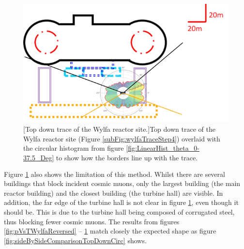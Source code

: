  \begin{figure}[!h]
 \centering
 \includegraphics[width=0.7\linewidth]{Chapter5/Figs/wylfaRasterNew/wylfaCircular0-37.5Deg_Overlay.png}
 [Top down trace of the Wylfa reactor site.]{Top down trace of the Wylfa reactor site (Figure \ref{subFig:wylfaTraceStep4}) overlaid with the circular histogram from figure \ref{fig:LinearHist_theta_0-37.5_Deg} to show how the borders line up with the trace.} 
 \label{fig:wylfaCircular0-37.5Deg_Overlay}
\end{figure}

Figure \ref{fig:wylfaCircular0-37.5Deg_Overlay} also shows the limitation of this method. Whilst there are several buildings that block incident cosmic muons, only the largest building (the main reactor building) and the closest building (the turbine hall) are visible. In addition, the far edge of the turbine hall is not clear in figure \ref{fig:wylfaCircular0-37.5Deg_Overlay}, even though it should be. This is due to the turbine hall being composed of corrugated steel, thus blocking fewer cosmic muons. The results from figures \ref{fig:pVsTWylfaReversed} -- \ref{fig:wylfaCircular0-37.5Deg_Overlay} match closely the expected shape as figure \ref{fig:sideBySideComparisonTopDownCirc} shows. 


